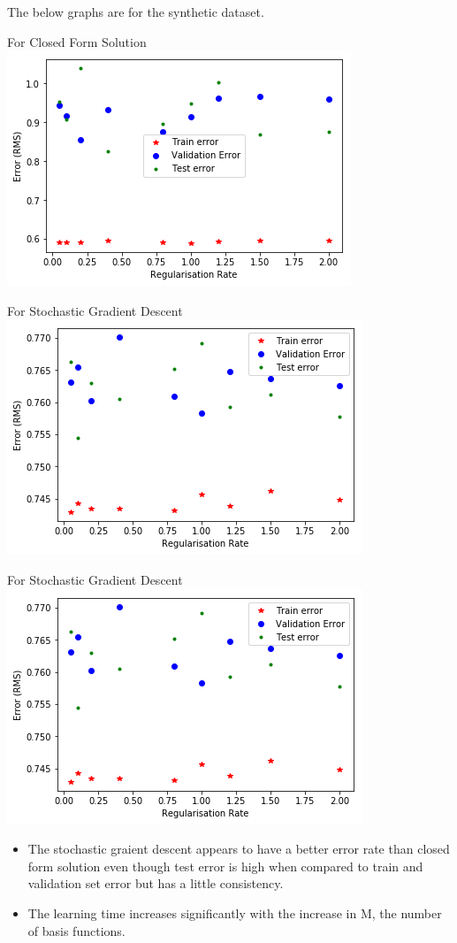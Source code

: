 \documentclass[a4paper,11pt]{article}
\begin{document}
The below graphs are for the synthetic dataset.\\
\begin{center}
	For Closed Form Solution
	\includegraphics[scale=0.8]{B2}
\end{center}\vfill
\begin{center}
	For Stochastic Gradient Descent
	\includegraphics[scale=0.8]{B3}
\end{center}
\begin{center}
	For Stochastic Gradient Descent
	\includegraphics[scale=0.8]{B3}
\end{center}

\begin{itemize}
 \item The stochastic graient descent appears to have a better error rate than closed form solution even though test error is high when compared to train and validation set error but has a little consistency.
\item The learning time increases significantly with the increase in $\mathrm{M}$, the number of basis functions. 
\end{itemize}
\end{document}
